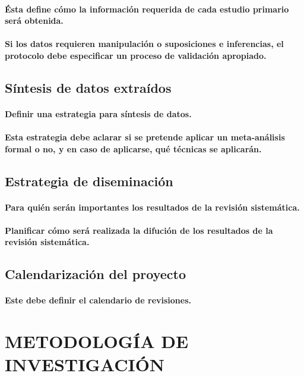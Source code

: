 \documentclass[10pt, twocolumn]{article}
\begin{document}
\paragraph{Ésta define cómo la información requerida de cada estudio primario será obtenida.}
\paragraph{Si los datos requieren manipulación o suposiciones e inferencias, el protocolo debe especificar un proceso de validación apropiado.}

\subsection{Síntesis de datos extraídos}
\paragraph{Definir una estrategia para síntesis de datos.}
\paragraph{Esta estrategia debe aclarar si se pretende aplicar un meta-análisis formal o no, y en caso de aplicarse, qué técnicas se aplicarán.}

\subsection{Estrategia de diseminación}
\paragraph{Para quién serán importantes los resultados de la revisión sistemática.}
\paragraph{Planificar cómo será realizada la difución de los resultados de la revisión sistemática.}

\subsection{Calendarización del proyecto}
\paragraph{Este debe definir el calendario de revisiones.}

\section{METODOLOGÍA DE INVESTIGACIÓN}
\end{document}
